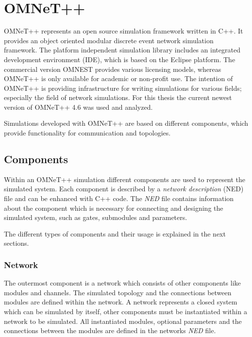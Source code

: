 \chapter{OMNeT++}
\label{cha:omnet}

OMNeT++ represents an open source simulation framework written in C++.
It provides an object oriented modular discrete event network simulation framework.
The platform independent simulation library includes an integrated development environment (IDE), which is based on the Eclipse platform.
The commercial version OMNEST provides various licensing models, whereas OMNeT++ is only available for academic or non-profit use.
The intention of OMNeT++ is providing infrastructure for writing simulations for various fields; especially the field of network simulations.
For this thesis the current newest version of OMNeT++ 4.6 was used and analyzed.

Simulations developed with OMNeT++ are based on different components, which provide functionality for communication and topologies.

\section{Components}
\label{sec:omnet_components}
Within an OMNeT++ simulation different components are used to represent the simulated system.
Each component is described by a \emph{network description} (NED) file and can be enhanced with C++ code.
The \emph{NED} file contains information about the component which is necessary for connecting and designing the simulated system, such as gates, submodules and parameters.

The different types of components and their usage is explained in the next sections.

\subsection{Network}
\label{sec:omnet_components_network}
The outermost component is a network which consists of other components like modules and channels.
The simulated topology and the connections between modules are defined within the network.
A network represents a closed system which can be simulated by itself, other components must be instantiated within a network to be simulated.
All instantiated modules, optional parameters and the connections between the modules are defined in the networks \emph{NED} file. \cite[section 3.2.1]{omnet_manual}

